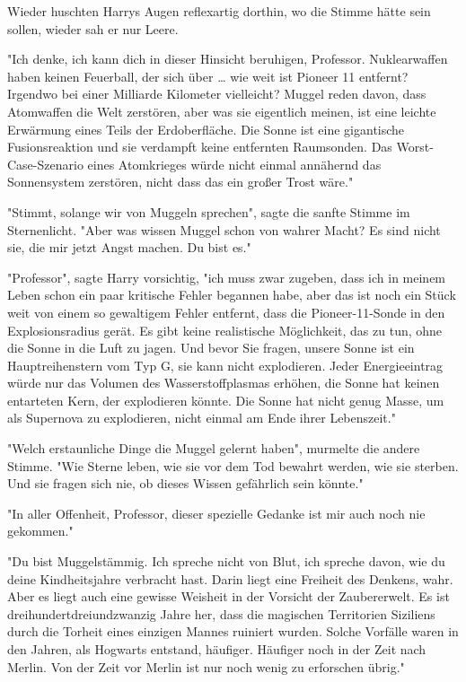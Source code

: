 {Wieder huschten Harrys Augen reflexartig dorthin, wo die Stimme hätte sein sollen, wieder sah er nur Leere.

"Ich denke, ich kann dich in dieser Hinsicht beruhigen, Professor. Nuklearwaffen haben keinen Feuerball, der sich über … wie weit ist Pioneer 11 entfernt? Irgendwo bei einer Milliarde Kilometer vielleicht? Muggel reden davon, dass Atomwaffen die Welt zerstören, aber was sie eigentlich meinen, ist eine leichte Erwärmung eines Teils der Erdoberfläche. Die Sonne ist eine gigantische Fusionsreaktion und sie verdampft keine entfernten Raumsonden. Das Worst-Case-Szenario eines Atomkrieges würde nicht einmal annähernd das Sonnensystem zerstören, nicht dass das ein großer Trost wäre."

"Stimmt, solange wir von Muggeln sprechen", sagte die sanfte Stimme im Sternenlicht. "Aber was wissen Muggel schon von wahrer Macht? Es sind nicht sie, die mir jetzt Angst machen. Du bist es."

"Professor", sagte Harry vorsichtig, "ich muss zwar zugeben, dass ich in meinem Leben schon ein paar kritische Fehler begannen habe, aber das ist noch ein Stück weit von einem so gewaltigem Fehler entfernt, dass die Pioneer-11-Sonde in den Explosionsradius gerät. Es gibt keine realistische Möglichkeit, das zu tun, ohne die Sonne in die Luft zu jagen. Und bevor Sie fragen, unsere Sonne ist ein Hauptreihenstern vom Typ G, sie kann nicht explodieren. Jeder Energieeintrag würde nur das Volumen des Wasserstoffplasmas erhöhen, die Sonne hat keinen entarteten Kern, der explodieren könnte. Die Sonne hat nicht genug Masse, um als Supernova zu explodieren, nicht einmal am Ende ihrer Lebenszeit."

"Welch erstaunliche Dinge die Muggel gelernt haben", murmelte die andere Stimme. "Wie Sterne leben, wie sie vor dem Tod bewahrt werden, wie sie sterben. Und sie fragen sich nie, ob dieses Wissen gefährlich sein könnte."

"In aller Offenheit, Professor, dieser spezielle Gedanke ist mir auch noch nie gekommen."

"Du bist Muggelstämmig. Ich spreche nicht von Blut, ich spreche davon, wie du deine Kindheitsjahre verbracht hast. Darin liegt eine Freiheit des Denkens, wahr. Aber es liegt auch eine gewisse Weisheit in der Vorsicht der Zaubererwelt. Es ist dreihundertdreiundzwanzig Jahre her, dass die magischen Territorien Siziliens durch die Torheit eines einzigen Mannes ruiniert wurden. Solche Vorfälle waren in den Jahren, als Hogwarts entstand, häufiger. Häufiger noch in der Zeit nach Merlin. Von der Zeit vor Merlin ist nur noch wenig zu erforschen übrig."

}
